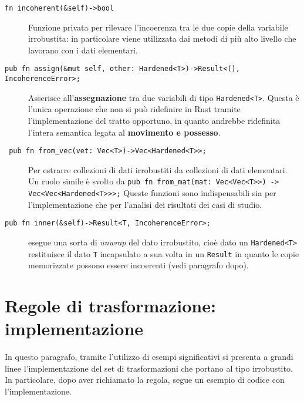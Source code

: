 \begin{description}
    \item[\texttt{fn incoherent(\&self)->bool}] Funzione privata per rilevare l'incoerenza tra le due copie della variabile irrobustita: in particolare viene utilizzata dai metodi di più alto livello che lavorano con i dati elementari.
    \item[\texttt{pub fn assign(\&mut self, other: Hardened<T>)->Result<(), IncoherenceError>;}]\quad \newline Asserisce all'\textbf{assegnazione} tra due variabili di tipo \texttt{Hardened<T>}. Questa è l'unica operazione che non si può ridefinire in Rust tramite l'implementazione del tratto opportuno, in quanto andrebbe ridefinita l'intera semantica legata al \textbf{movimento e possesso}.
    \item[\texttt{ pub fn from\_vec(vet: Vec<T>)->Vec<Hardened<T>>;} ] Per estrarre collezioni di dati irrobustiti da collezioni di dati elementari. Un ruolo simile è svolto da \texttt{pub fn from\_mat(mat: Vec<Vec<T>>) -> Vec<Vec<Hardened<T>>>;} Queste funzioni sono indispensabili sia per l'implementazione che per l'analisi dei risultati dei casi di studio.
    \item[\texttt{pub fn inner(\&self)->Result<T, IncoherenceError>;}] esegue una sorta di \textit{unwrap} del dato irrobustito, cioè dato un \texttt{Hardened<T>} restituisce il dato \texttt{T} incapsulato a sua volta in un \texttt{Result} in quanto le copie memorizzate possono essere incoerenti (vedi paragrafo dopo).
\end{description}

\section{Regole di trasformazione: implementazione}
In questo paragrafo, tramite l'utilizzo di esempi significativi si presenta a grandi linee l'implementazione del set di trasformazioni che portano al tipo irrobustito. In particolare, dopo aver richiamato la regola, segue un esempio di codice con l'implementazione.\\

\noindent
\begin{center}
%
\end{center}

